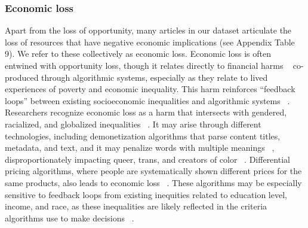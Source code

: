 \subsubsection{Economic loss} Apart from the loss of opportunity, many articles in our dataset articulate the loss of resources that have negative economic implications (see Appendix Table 9). We refer to these collectively as economic loss. Economic loss is often entwined with opportunity loss, though it relates directly to financial harms ~\cite{cave2019bridging, ONeil_2016} co-produced through algorithmic systems, especially as they relate to lived experiences of poverty and economic inequality. This harm reinforces “feedback loops” between existing socioeconomic inequalities and algorithmic systems ~\cite[p. 14]{Dobbe_Krendl_Gilbert_Mintz_2021}. Researchers recognize economic loss as a harm that intersects with gendered, racialized, and globalized inequalities ~\cite{Avila_2018}. It may arise through different technologies, including demonetization algorithms that parse content titles, metadata, and text, and it may penalize words with multiple meanings ~\cite{Caplan_Gillespie_2020, Duffy_Meisner_2022}, disproportionately impacting queer, trans, and creators of color ~\cite{Duffy_Meisner_2022}. Differential pricing algorithms, where people are systematically shown different prices for the same products, also leads to economic loss ~\cite{Chen_Mislove_Wilson_2016}. These algorithms may be especially sensitive to feedback loops from existing inequities related to education level, income, and race, as these inequalities are likely reflected in the criteria algorithms use to make decisions ~\cite{barocas-hardt-narayanan, Pandey_Caliskan_2021}.

\begin{table}[t]
\centering
\setlength{\tabcolsep}{4.5pt}
\caption{Allocative harms}
\label{allocativeharms}
\end{table}

